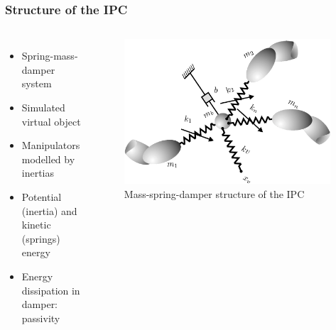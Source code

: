 \documentclass[student]{ITRslides}
\begin{document}
%			
%	
%
%		
%		
%			

\begin{frame}
	\frametitle{Structure of the IPC}
\begin{columns}
			
	
		\begin{itemize}
			\item Spring-mass-damper system
			\item Simulated virtual object
			\item Manipulators modelled by inertias
			\item Potential (inertia) and kinetic (springs) energy
			\item Energy dissipation in damper: passivity
		\end{itemize}

		
             \begin{figure}[htb]
			\centering
			\includegraphics[width=0.98\textwidth]{IPCsprings.png}
			\caption{Mass-spring-damper structure of the IPC 						\cite{Stramigioli_01}}
			\end{figure}
		
			
		\end{columns}
\end{frame}
\end{document}
